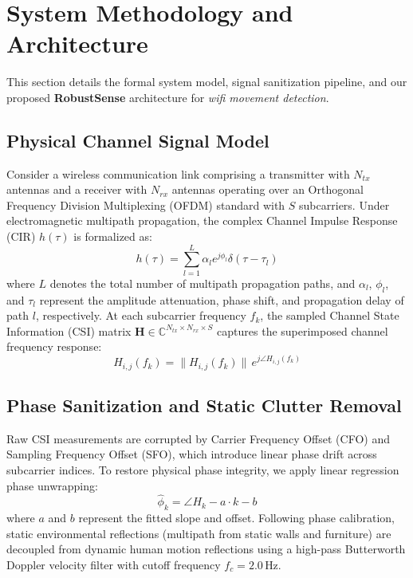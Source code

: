 \section{System Methodology and Architecture}
\label{sec:methodology}
This section details the formal system model, signal sanitization pipeline, and our proposed \textbf{RobustSense} architecture for \textit{wifi movement detection}.

\subsection{Physical Channel Signal Model}
Consider a wireless communication link comprising a transmitter with $N_{tx}$ antennas and a receiver with $N_{rx}$ antennas operating over an Orthogonal Frequency Division Multiplexing (OFDM) standard with $S$ subcarriers. Under electromagnetic multipath propagation, the complex Channel Impulse Response (CIR) $h(\tau)$ is formalized as:
\begin{equation}
    h(\tau) = \sum_{l=1}^{L} \alpha_l e^{j \phi_l} \delta(\tau - \tau_l)
    \label{eq:cir}
\end{equation}
where $L$ denotes the total number of multipath propagation paths, and $\alpha_l$, $\phi_l$, and $\tau_l$ represent the amplitude attenuation, phase shift, and propagation delay of path $l$, respectively. At each subcarrier frequency $f_k$, the sampled Channel State Information (CSI) matrix $\mathbf{H} \in \mathbb{C}^{N_{tx} \times N_{rx} \times S}$ captures the superimposed channel frequency response:
\begin{equation}
    H_{i,j}(f_k) = \|H_{i,j}(f_k)\| \, e^{j \angle H_{i,j}(f_k)}
    \label{eq:csi}
\end{equation}

\subsection{Phase Sanitization and Static Clutter Removal}
Raw CSI measurements are corrupted by Carrier Frequency Offset (CFO) and Sampling Frequency Offset (SFO), which introduce linear phase drift across subcarrier indices. To restore physical phase integrity, we apply linear regression phase unwrapping:
\begin{equation}
    \hat{\phi}_k = \angle H_k - a \cdot k - b
    \label{eq:phase_unwrap}
\end{equation}
where $a$ and $b$ represent the fitted slope and offset. Following phase calibration, static environmental reflections (multipath from static walls and furniture) are decoupled from dynamic human motion reflections using a high-pass Butterworth Doppler velocity filter with cutoff frequency $f_c = 2.0\,\text{Hz}$.

